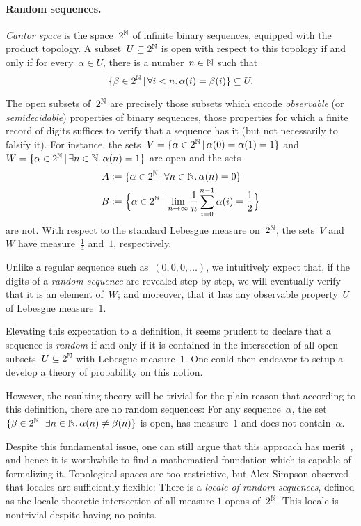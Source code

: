 \documentclass{ws-rv9x6}
\begin{document}
{\paragraph{Random sequences.} \emph{Cantor space} is the space~$2^{\mathbb{N}}$ of
infinite binary sequences, equipped with the product topology. A subset~$U
\subseteq 2^{\mathbb{N}}$ is open with respect to this topology if and only if for
every~$\alpha \in U$, there is a number~$n \in \mathbb{N}$ such that
\[ \{ \beta \in 2^{\mathbb{N}} \,|\, \forall i < n\mathpunct{.} \alpha(i) = \beta(i) \} \subseteq U. \]

The open subsets of~$2^{\mathbb{N}}$ are precisely those subsets which encode
\emph{observable} (or \emph{semidecidable}) properties of binary sequences,
those properties for which a finite record of digits suffices to verify that a
sequence has it (but not necessarily to falsify it). For instance, the sets~$V
= \{ \alpha \in 2^{\mathbb{N}} \,|\, \alpha(0) = \alpha(1) = 1 \}$ and~$W = \{
\alpha \in 2^{\mathbb{N}} \,|\, \exists n\in\mathbb{N}\mathpunct{.} \alpha(n) = 1 \}$ are open and the sets
\begin{align*}
  A &\vcentcolon= \{ \alpha \in 2^{\mathbb{N}} \,|\, \forall n\in\mathbb{N}\mathpunct{.} \alpha(n) = 0 \} \\
  B &\vcentcolon= \Bigl\{ \alpha \in 2^{\mathbb{N}} \,\Big|\, \lim_{n \to \infty} \frac{1}{n} \sum_{i=0}^{n-1} \alpha(i) = \frac{1}{2} \Bigr\}
\end{align*}
are not. With respect to the standard Lebesgue measure on~$2^{\mathbb{N}}$, the sets~$V$
and~$W$ have measure~$\frac{1}{4}$ and~$1$, respectively.

Unlike a regular sequence such as~$(0,0,0,\ldots)$, we intuitively expect that, if the
digits of a \emph{random sequence} are revealed step by step, we will
eventually verify that it is an element of~$W$; and moreover, that it has any
observable property~$U$ of Lebesgue measure~$1$.

Elevating this expectation to a definition, it seems prudent to declare that a
sequence is \emph{random} if and only if it is contained in the intersection of
all open subsets~$U \subseteq 2^{\mathbb{N}}$ with Lebesgue measure~$1$. One could then
endeavor to setup a develop a theory of probability on this notion.

However, the resulting theory will be trivial for the plain reason that
according to this definition, there are no random sequences: For any
sequence~$\alpha$, the set~$\{ \beta \in 2^{\mathbb{N}} \,|\, \exists n \in \mathbb{N}\mathpunct{.}
\alpha(n) \neq \beta(n) \}$ is open, has measure~$1$ and does not
contain~$\alpha$.

Despite this fundamental issue, one can still argue that this approach has
merit~\cite{simpson:measure}, and hence it is worthwhile to find a
mathematical foundation which is capable of formalizing it. Topological
spaces are too restrictive, but Alex Simpson observed that locales are
sufficiently flexible: There is a \emph{locale of random sequences}, defined as
the locale-theoretic intersection of all measure-$1$ opens of~$2^{\mathbb{N}}$. This
locale is nontrivial despite having no points.


}
\end{document}
